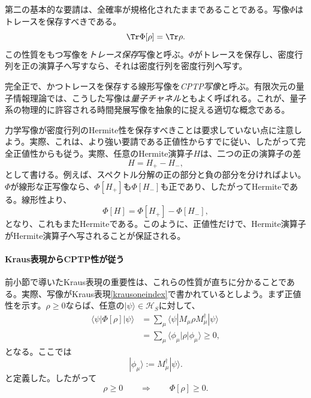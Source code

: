 \documentclass[a4paper,11pt,oneside]{article}
\theoremstyle{definition}
\numberwithin{equation}{section}
\begin{document}
第二の基本的な要請は、全確率が規格化されたままであることである。写像$\Phi$はトレースを保存すべきである。
\begin{equation}
\Tr \Phi[\rho] = \Tr \rho .
\end{equation}
この性質をもつ写像を\textit{トレース保存}写像と呼ぶ。$\Phi$がトレースを保存し、密度行列を正の演算子へ写すなら、それは密度行列を密度行列へ写す。



完全正で、かつトレースを保存する線形写像を\textit{CPTP写像}と呼ぶ。有限次元の量子情報理論では、こうした写像は\textit{量子チャネル}ともよく呼ばれる。これが、量子系の物理的に許容される時間発展写像を抽象的に捉える適切な概念である。



力学写像が密度行列のHermite性を保存すべきことは要求していない点に注意しよう。実際、これは、より強い要請である正値性からすでに従い、したがって完全正値性からも従う。実際、任意のHermite演算子$H$は、二つの正の演算子の差
\begin{equation}
H = H_{+} - H_{-} ,
\end{equation}
として書ける。例えば、スペクトル分解の正の部分と負の部分を分ければよい。$\Phi$が線形な正写像なら、$\Phi[H_{+}]$も$\Phi[H_{-}]$も正であり、したがってHermiteである。線形性より、
\begin{equation}
\Phi[H] = \Phi[H_{+}] - \Phi[H_{-}] ,
\end{equation}
となり、これもまたHermiteである。このように、正値性だけで、Hermite演算子がHermite演算子へ写されることが保証される。





\paragraph{Kraus表現からCPTP性が従う}



前小節で導いたKraus表現の重要性は、これらの性質が直ちに分かることである。実際、写像がKraus表現\eqref{krausoneindex}で書かれているとしよう。まず正値性を示す。$\rho \geq 0$ならば、任意の$|\psi\rangle \in \mathcal H_S$に対して、
\begin{align}
\langle \psi | \Phi[\rho] | \psi \rangle
&=
\sum_\mu
\langle \psi | M_\mu \rho M_\mu^\dagger | \psi \rangle
\nonumber\\
&=
\sum_\mu
\langle \phi_\mu | \rho | \phi_\mu \rangle
\geq 0 ,
\end{align}
となる。ここでは
\begin{equation}
|\phi_\mu\rangle := M_\mu^\dagger |\psi\rangle .
\end{equation}
と定義した。したがって
\begin{equation}
\rho \geq 0
\qquad \Longrightarrow \qquad
\Phi[\rho] \geq 0 .
\end{equation}
\end{document}
